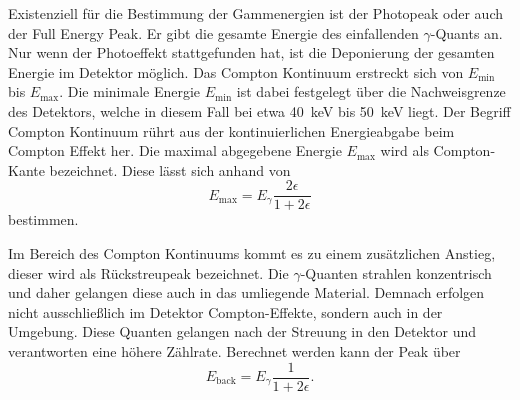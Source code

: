 Existenziell für die Bestimmung der Gammenergien ist der Photopeak oder auch der Full Energy Peak.
Er gibt die gesamte Energie des einfallenden $\gamma$-Quants an. Nur wenn der Photoeffekt stattgefunden hat, ist die Deponierung der 
gesamten Energie im Detektor möglich. 
Das Compton Kontinuum erstreckt sich von $E_{\text{min}}$ bis $E_{\text{max}}$. Die minimale Energie $E_{\text{min}}$ ist dabei festgelegt über
die Nachweisgrenze des Detektors, welche in diesem Fall bei etwa \qty{40}{\kilo\eV} bis \qty{50}{\kilo\eV} liegt. Der Begriff Compton
Kontinuum rührt aus der kontinuierlichen Energieabgabe beim Compton Effekt her.
Die maximal abgegebene Energie $E_{\text{max}}$ wird als Compton-Kante bezeichnet.
Diese lässt sich anhand von
\begin{equation}
    E_{\text{max}} = E_\gamma \frac{2 \epsilon}{1+2\epsilon}
\end{equation}
bestimmen.

Im Bereich des Compton Kontinuums kommt es zu einem zusätzlichen Anstieg, dieser wird als Rückstreupeak
bezeichnet. Die $\gamma$-Quanten strahlen konzentrisch und daher gelangen diese auch in das umliegende Material.
Demnach erfolgen nicht ausschließlich im Detektor Compton-Effekte, sondern auch in der Umgebung. Diese Quanten gelangen nach der
Streuung in den Detektor und verantworten eine höhere Zählrate.
Berechnet werden kann der Peak über
\begin{equation}
    E_{\text{back}} = E_\gamma \frac{1}{1+2\epsilon}.
\end{equation}



